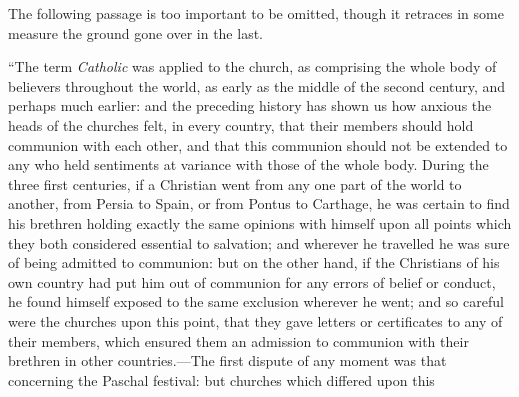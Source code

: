 The
following passage is too important to be omitted, though it retraces in
some measure the ground gone over in the last.

``The term
\emph{Catholic} was applied to the church, as comprising the whole body of
believers throughout the world, as early as the middle of the second
century, and perhaps much earlier: and the preceding history has shown
us how anxious the heads of the churches felt, in every country, that
their members should hold communion with each other, and that this
communion should not be extended to any who held sentiments at variance
with those of the whole body. During the three first centuries, if a
Christian went from any one part of the world to another, from Persia to
Spain, or from Pontus to Carthage, he was certain to find his brethren
holding exactly the same opinions with himself upon all points which
they both considered essential to salvation; and wherever he travelled
he was sure of being admitted to communion: but on the other hand, if
the Christians of his own country had put him out of communion for any
errors of belief or conduct, he found himself exposed to the same
exclusion wherever he went; and so careful were the churches upon this
point, that they gave letters or certificates to any of their members,
which ensured them an admission to communion with their brethren in
other countries.—The first dispute of any moment was that concerning
the Paschal festival: but churches which differed upon this

